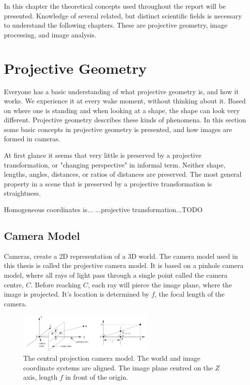 In this chapter the theoretical concepts used throughout the report will be presented. Knowledge of several related, but distinct scientific fields is necessary to understand the following chapters. These are projective geometry, image processing, and image analysis.

\section{Projective Geometry}
Everyone has a basic understanding of what projective geometry is, and how it works.
We experience it at every wake moment, without thinking about it. 
Based on where one is standing and when looking at a shape, the shape can look very different. %
Projective geometry describes these kinds of phenomena.
In this section some basic concepts in projective geometry is presented, and how images are formed in cameras.

At first glance it seems that very little is preserved by a projective transformation, or "changing perspective" in informal term.
Neither shape, lengths, angles, distances, or ratios of distances are preserved.
The most general property in a scene that is preserved by a projective transformation is straightness. \cite[1]{hartley-zisserman}

Homogeneous coordinates is... ...projective transformation...TODO %

\subsection{Camera Model}
Cameras, create a 2D representation of a 3D world.
The camera model used in this thesis is called the projective camera model.
It is based on a pinhole camera model, where all rays of light pass through a single point called the camera centre, $C$. Before reaching $C$, each ray will pierce the image plane, where the image is projected.
It's location is determined by $f$, the focal length of the camera.

\begin{figure}[h]
\begin{center}
\includegraphics[width=0.6\textwidth]{figures/central_projection_camera.png}
\end{center}
\caption{The central projection camera model. The world and image coordinate systems are aligned. The image plane centred on the $Z$ axis, length $f$ in front of the origin.}
\label{fig:central_projection_camera} %
\end{figure}

